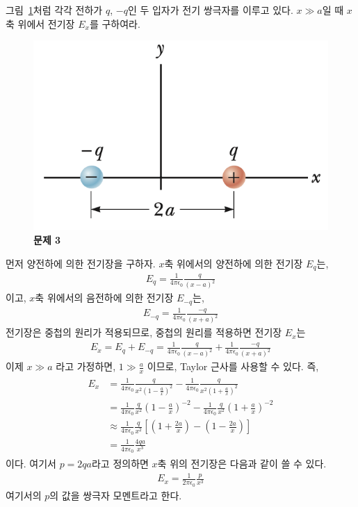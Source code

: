 \documentclass[tightenlines,floatfix,nofootinbib,superscriptaddress,fleqn]{revtex4}
\begin{document}
 그림~\ref{fig:1}처럼 각각 전하가 $q$,
$-q$인 두 입자가 전기 쌍극자를 이루고 있다. $x\gg a$일 때 $x$ 축
위에서 전기장 $E_x$를 구하여라. 
\begin{figure}[htp]
  \centering
  \includegraphics[scale=0.6]{qfig2-1.png}
  \caption{\textbf{문제 3}}
  \label{fig:1}
\end{figure}

\vspace{1.cm}
먼저 양전하에 의한 전기장을 구하자. $x$축 위에서의 양전하에 의한 전기장 $E_q$는,
\begin{align}
  E_q=\frac{1}{4\pi\epsilon_0}\frac{q}{\left(x-a\right)^2}
\end{align}
이고, $x$축 위에서의 음전하에 의한 전기장 $E_{-q}$는,
\begin{align}
  E_{-q}=\frac{1}{4\pi\epsilon_0}\frac{-q}{\left(x+a\right)^2}
\end{align}
전기장은 중첩의 원리가 적용되므로, 중첩의 원리를 적용하면 전기장 $E_x$는
\begin{align}
  E_x=E_q+E_{-q}=\frac{1}{4\pi\epsilon_0}\frac{q}{\left(x-a\right)^2}+\frac{1}{4\pi\epsilon_0}\frac{-q}{\left(x+a\right)^2}
\end{align}
이제 $x\gg a$ 라고 가정하면, $1\gg\frac{a}{x}$ 이므로, Taylor 근사를 사용할 수 있다. 즉,
\begin{align}
  \begin{split}
    E_x&=\frac{1}{4\pi\epsilon_0}\frac{q}{x^2\left(1-\frac{a}{x}\right)^2}-\frac{1}{4\pi\epsilon_0}\frac{q}{x^2\left(1+\frac{a}{x}\right)^2}\\
    &=\frac{1}{4\pi\epsilon_0}\frac{q}{x^2}\left(1-\frac{a}{x}\right)^{-2}-\frac{1}{4\pi\epsilon_0}\frac{q}{x^2}\left(1+\frac{a}{x}\right)^{-2}\\
    &\approx\frac{1}{4\pi\epsilon_0}\frac{q}{x^2}\left[\left(1+\frac{2a}{x}\right)-\left(1-\frac{2a}{x}\right)\right]\\
    &=\frac{1}{4\pi\epsilon_0}\frac{4qa}{x^3}
  \end{split}
\end{align}
이다. 여기서 $p=2qa$라고 정의하면 $x$축 위의 전기장은 다음과 같이 쓸 수 있다.
\begin{align}
  E_x=\frac{1}{2\pi\epsilon_0}\frac{p}{x^3}
\end{align}
여기서의 $p$의 값을 쌍극자 모멘트라고 한다.
\vspace{1.cm}
\end{document}
